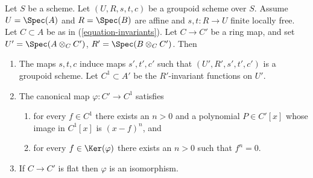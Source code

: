 \begin{lemma}
\label{lemma-invariants-base-change}
Let $S$ be a scheme. Let $(U, R, s, t, c)$ be a groupoid scheme over $S$.
Assume $U = \Spec(A)$ and $R = \Spec(B)$ are affine and
$s, t : R \to U$ finite locally free. Let $C \subset A$ be as in
(\ref{equation-invariants}). Let $C \to C'$ be a ring map, and set
$U' = \Spec(A \otimes_C C')$,
$R' = \Spec(B \otimes_C C')$.
Then
\begin{enumerate}
\item The maps $s, t, c$ induce maps $s', t', c'$ such that
$(U', R', s', t', c')$ is a groupoid scheme. Let $C^1 \subset A'$
be the $R'$-invariant functions on $U'$.
\item The canonical map $\varphi : C' \to C^1$ satisfies
\begin{enumerate}
\item for every $f \in C^1$ there exists an $n > 0$ and a
polynomial $P \in C'[x]$ whose image in $C^1[x]$ is
$(x - f)^n$, and
\item for every $f \in \Ker(\varphi)$ there exists
an $n > 0$ such that $f^n = 0$.
\end{enumerate}
\item If $C \to C'$ is flat then $\varphi$ is an isomorphism.
\end{enumerate}
\end{lemma}


